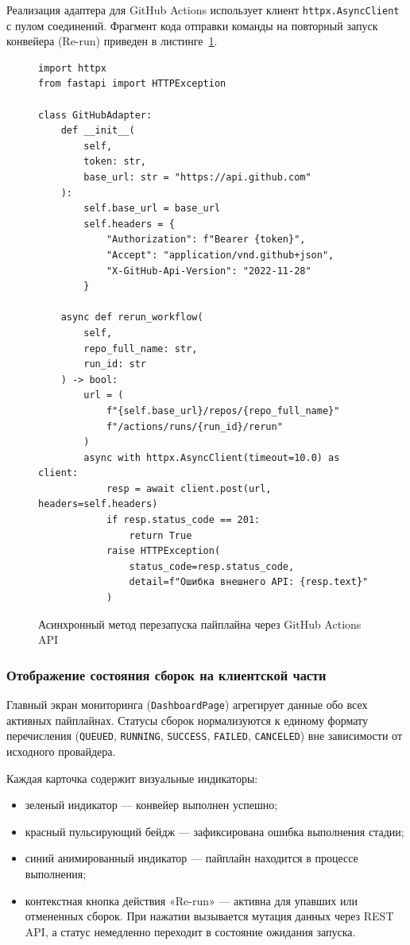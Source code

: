 Реализация адаптера для GitHub Actions использует клиент \texttt{httpx.AsyncClient} с пулом соединений. Фрагмент кода отправки команды на повторный запуск конвейера (Re-run) приведен в листинге~\ref{lst:github_rerun}.

\begin{figure}[H]
\centering
\begin{minipage}{0.95\textwidth}
\footnotesize
\begin{verbatim}
import httpx
from fastapi import HTTPException

class GitHubAdapter:
    def __init__(
        self,
        token: str,
        base_url: str = "https://api.github.com"
    ):
        self.base_url = base_url
        self.headers = {
            "Authorization": f"Bearer {token}",
            "Accept": "application/vnd.github+json",
            "X-GitHub-Api-Version": "2022-11-28"
        }

    async def rerun_workflow(
        self,
        repo_full_name: str,
        run_id: str
    ) -> bool:
        url = (
            f"{self.base_url}/repos/{repo_full_name}"
            f"/actions/runs/{run_id}/rerun"
        )
        async with httpx.AsyncClient(timeout=10.0) as client:
            resp = await client.post(url, headers=self.headers)
            if resp.status_code == 201:
                return True
            raise HTTPException(
                status_code=resp.status_code,
                detail=f"Ошибка внешнего API: {resp.text}"
            )
\end{verbatim}
\end{minipage}
\caption{Асинхронный метод перезапуска пайплайна через GitHub Actions API}
\label{lst:github_rerun}
\end{figure}

\subsubsection{Отображение состояния сборок на клиентской части}
Главный экран мониторинга (\texttt{DashboardPage}) агрегирует данные обо всех активных пайплайнах. Статусы сборок нормализуются к единому формату перечисления (\texttt{QUEUED}, \texttt{RUNNING}, \texttt{SUCCESS}, \texttt{FAILED}, \texttt{CANCELED}) вне зависимости от исходного провайдера.

Каждая карточка содержит визуальные индикаторы:
\begin{itemize}
    \item зеленый индикатор --- конвейер выполнен успешно;
    \item красный пульсирующий бейдж --- зафиксирована ошибка выполнения стадии;
    \item синий анимированный индикатор --- пайплайн находится в процессе выполнения;
    \item контекстная кнопка действия «Re-run» --- активна для упавших или отмененных сборок. При нажатии вызывается мутация данных через REST API, а статус немедленно переходит в состояние ожидания запуска.
\end{itemize}


